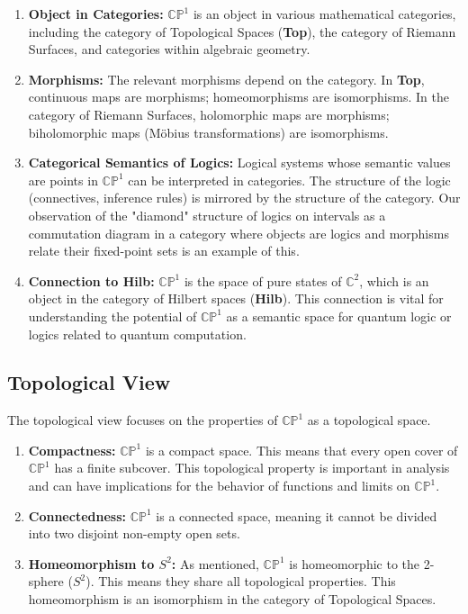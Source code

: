\documentclass{article}
\begin{document}
	\begin{enumerate}
		\item \textbf{Object in Categories:} $\mathbb{CP}^1$ is an object in various mathematical categories, including the category of Topological Spaces (\textbf{Top}), the category of Riemann Surfaces, and categories within algebraic geometry.
		
		\item \textbf{Morphisms:} The relevant morphisms depend on the category. In \textbf{Top}, continuous maps are morphisms; homeomorphisms are isomorphisms. In the category of Riemann Surfaces, holomorphic maps are morphisms; biholomorphic maps (M\"{o}bius transformations) are isomorphisms.
		
		\item \textbf{Categorical Semantics of Logics:} Logical systems whose semantic values are points in $\mathbb{CP}^1$ can be interpreted in categories. The structure of the logic (connectives, inference rules) is mirrored by the structure of the category. Our observation of the "diamond" structure of logics on intervals as a commutation diagram in a category where objects are logics and morphisms relate their fixed-point sets is an example of this.
		
		\item \textbf{Connection to Hilb:} $\mathbb{CP}^1$ is the space of pure states of $\mathbb{C}^2$, which is an object in the category of Hilbert spaces (\textbf{Hilb}). This connection is vital for understanding the potential of $\mathbb{CP}^1$ as a semantic space for quantum logic or logics related to quantum computation.
	\end{enumerate}
	
	\subsection{Topological View}
	
	The topological view focuses on the properties of $\mathbb{CP}^1$ as a topological space.
	
	\begin{enumerate}
		\item \textbf{Compactness:} $\mathbb{CP}^1$ is a compact space. This means that every open cover of $\mathbb{CP}^1$ has a finite subcover. This topological property is important in analysis and can have implications for the behavior of functions and limits on $\mathbb{CP}^1$.
		
		\item \textbf{Connectedness:} $\mathbb{CP}^1$ is a connected space, meaning it cannot be divided into two disjoint non-empty open sets.
		
		\item \textbf{Homeomorphism to $S^2$:} As mentioned, $\mathbb{CP}^1$ is homeomorphic to the 2-sphere ($S^2$). This means they share all topological properties. This homeomorphism is an isomorphism in the category of Topological Spaces.
	\end{enumerate}
	
\end{document}
